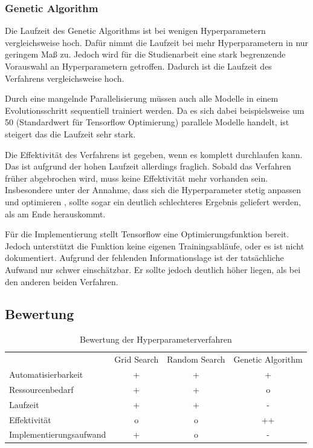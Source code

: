 \subsubsection{Genetic Algorithm}
Die Laufzeit des Genetic Algorithms ist bei wenigen Hyperparametern vergleichsweise hoch.
Dafür nimmt die Laufzeit bei mehr Hyperparametern in nur geringem Maß zu.
Jedoch wird für die Studienarbeit eine stark begrenzende Vorauswahl an Hyperparametern getroffen. 
Dadurch ist die Laufzeit des Verfahrens vergleichsweise hoch.

Durch eine mangelnde Parallelisierung müssen auch alle Modelle in einem Evolutionsschritt sequentiell trainiert werden.
Da es sich dabei beispielsweise um 50 (Standardwert für Tensorflow Optimierung) parallele Modelle handelt, ist steigert das die Laufzeit sehr stark.
\newline

Die Effektivität des Verfahrens ist gegeben, wenn es komplett durchlaufen kann.
Das ist aufgrund der hohen Laufzeit allerdings fraglich.
Sobald das Verfahren früher abgebrochen wird, muss keine Effektivität mehr vorhanden sein.
Insbesondere unter der Annahme, dass sich die Hyperparameter stetig anpassen und optimieren , sollte sogar ein deutlich schlechteres Ergebnis geliefert werden, als am Ende herauskommt.
\newline

Für die Implementierung stellt Tensorflow eine Optimierungsfunktion bereit.
Jedoch unterstützt die Funktion keine eigenen Trainingsabläufe, oder es ist nicht dokumentiert.
Aufgrund der fehlenden Informationslage ist der tatsächliche Aufwand nur schwer einschätzbar. %
Er sollte jedoch deutlich höher liegen, als bei den anderen beiden Verfahren.

\subsection{Bewertung}

\begin{table}[H]
	\centering
	\begin{tabular}{l|c|c|c}
		                        & Grid Search & Random Search & Genetic Algorithm \\
		Automatisierbarkeit     &      +      &       +       &         +         \\
		Ressourcenbedarf        &      +      &       +       &         o         \\
		Laufzeit                &      +      &       +       &         -         \\
		Effektivität            &      o      &       o       &        ++         \\
		Implementierungsaufwand &      +      &       o       &         -
	\end{tabular}
	\caption{Bewertung der Hyperparameterverfahren}
\end{table}


